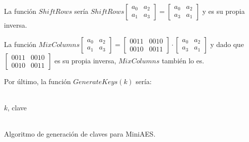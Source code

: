 	La función $ShiftRows$ sería $ShiftRows \left[\begin{matrix}a_0 & a_2\\ a_1 & a_3\end{matrix}\right]
	= \left[\begin{matrix}a_0 & a_2 \\ a_3 & a_1\end{matrix}\right]$ y es su propia inversa.
	
	La función $MixColumns \left[\begin{matrix}a_0 & a_2\\ a_1 & a_3\end{matrix}\right] =
	\left[\begin{matrix}0011 & 0010 \\ 0010 & 0011\end{matrix}\right] \cdot \left[\begin{matrix}a_0 & a_2 \\
	a_3 & a_1\end{matrix}\right]$ y dado que $\left[\begin{matrix}0011 & 0010 \\ 0010 & 0011\end{matrix}\right]$
	es su propia inversa, $MixColumns$ también lo es.
	
	Por último, la función $GenerateKeys(k)$ sería:
	\begin{algorithm}[H]
		\begin{algorithmic}[1]
			\REQUIRE \ \\
				\texttt{$k$}, clave\\ \
			\STATE{\texttt{$\omega_5 = \omega_1 \oplus \omega_4$}}
			\STATE{\texttt{$\omega_9 = \omega_5 \oplus \omega_8$}}

		\end{algorithmic}
		\caption{Algoritmo de generación de claves para MiniAES.}
		\label{GenKeys}
	\end{algorithm}
	
